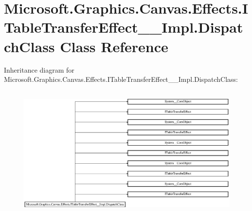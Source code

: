 \hypertarget{class_microsoft_1_1_graphics_1_1_canvas_1_1_effects_1_1_i_table_transfer_effect_____impl_1_1_dispatch_class}{}\section{Microsoft.\+Graphics.\+Canvas.\+Effects.\+I\+Table\+Transfer\+Effect\+\_\+\+\_\+\+Impl.\+Dispatch\+Class Class Reference}
\label{class_microsoft_1_1_graphics_1_1_canvas_1_1_effects_1_1_i_table_transfer_effect_____impl_1_1_dispatch_class}
Inheritance diagram for Microsoft.\+Graphics.\+Canvas.\+Effects.\+I\+Table\+Transfer\+Effect\+\_\+\+\_\+\+Impl.\+Dispatch\+Class\+:\begin{figure}[H]
\begin{center}
\leavevmode
\includegraphics[height=6.739606cm]{class_microsoft_1_1_graphics_1_1_canvas_1_1_effects_1_1_i_table_transfer_effect_____impl_1_1_dispatch_class}
\end{center}
\end{figure}
